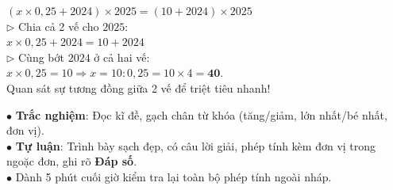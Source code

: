 \documentclass[14pt,a4paper,oneside]{extbook}
\begin{document}
\noindent
\begin{minipage}[t]{0.52\textwidth}
  \begin{tcolorbox}[
    enhanced,
    title={\footnotesize\bfseries\color{white}\faStar\ 2. Dạng toán tìm $x$ nâng cao},
    colback=teal!2!white,
    colframe=teal!75!black,
    arc=2.5mm, boxrule=0.8pt, top=1.8mm, bottom=1.8mm, left=2.2mm, right=2.2mm
  ]
    \footnotesize
    $(x \times 0,25 + 2024) \times 2025 = (10 + 2024) \times 2025$\\
    $\triangleright$ Chia cả 2 vế cho $2025$:\\
    \quad $x \times 0,25 + 2024 = 10 + 2024$\\
    $\triangleright$ Cùng bớt $2024$ ở cả hai vế:\\
    \quad $x \times 0,25 = 10 \Rightarrow x = 10 : 0,25 = 10 \times 4 = \mathbf{40}$.\\
    Quan sát sự tương đồng giữa 2 vế để triệt tiêu nhanh!
  \end{tcolorbox}
\end{minipage}%
\hfill
\begin{minipage}[t]{0.46\textwidth}
  \begin{tcolorbox}[
    enhanced,
    title={\footnotesize\bfseries\color{white}\faTrophy\ 3. Kỹ năng làm bài thi đạt điểm tối đa},
    colback=purple!2!white,
    colframe=purple!70!black,
    arc=2.5mm, boxrule=0.8pt, top=1.8mm, bottom=1.8mm, left=2mm, right=2mm
  ]
    \footnotesize
    $\bullet$ \textbf{Trắc nghiệm}: Đọc kĩ đề, gạch chân từ khóa (tăng/giảm, lớn nhất/bé nhất, đơn vị).\\
    $\bullet$ \textbf{Tự luận}: Trình bày sạch đẹp, có câu lời giải, phép tính kèm đơn vị trong ngoặc đơn, ghi rõ \textbf{Đáp số}.\\
    $\bullet$ Dành 5 phút cuối giờ kiểm tra lại toàn bộ phép tính ngoài nháp.
  \end{tcolorbox}
\end{minipage}

\vspace{3mm}
\end{document}
